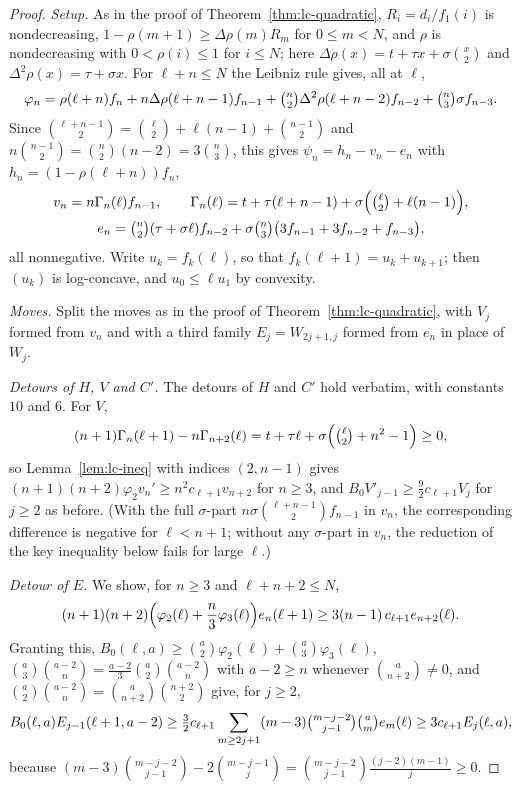 \begin{proof}
\emph{Setup.} As in the proof of Theorem~\ref{thm:lc-quadratic}, $R_i=d_i/f_1(i)$ is nondecreasing, $1-\rho(m+1)\geq\Delta\rho(m)R_m$ for $0\leq m<N$, and $\rho$ is nondecreasing with $0<\rho(i)\leq1$ for $i\leq N$; here $\Delta\rho(x)=t+\tau x+\sigma\binom x2$ and $\Delta^2\rho(x)=\tau+\sigma x$. For $\ell+n\leq N$ the Leibniz rule gives, all at $\ell$,
\[
\varphi_n=\rho(\ell+n)f_n+n\Delta\rho(\ell+n-1)f_{n-1}+\tbinom n2\Delta^2\rho(\ell+n-2)f_{n-2}+\tbinom n3\sigma f_{n-3}.
\]
Since $\binom{\ell+n-1}2=\binom\ell2+\ell(n-1)+\binom{n-1}2$ and $n\binom{n-1}2=\binom n2(n-2)=3\binom n3$, this gives $\psi_n=h_n-v_n-e_n$ with $h_n=(1-\rho(\ell+n))f_n$,
\[
\begin{gathered}
v_n=n\Gamma_n(\ell)f_{n-1},\qquad\Gamma_n(\ell)=t+\tau(\ell+n-1)+\sigma\Bigl(\tbinom\ell2+\ell(n-1)\Bigr),\\
e_n=\tbinom n2(\tau+\sigma\ell)f_{n-2}+\sigma\tbinom n3\bigl(3f_{n-1}+3f_{n-2}+f_{n-3}\bigr),
\end{gathered}
\]
all nonnegative. Write $u_k=f_k(\ell)$, so that $f_k(\ell+1)=u_k+u_{k+1}$; then $(u_k)$ is log-concave, and $u_0\leq\ell u_1$ by convexity.

\emph{Moves.} Split the moves as in the proof of Theorem~\ref{thm:lc-quadratic}, with $V_j$ formed from $v_n$ and with a third family $E_j=W_{2j+1,j}$ formed from $e_n$ in place of $W_j$.

\emph{Detours of $H$, $V$ and $C'$.} The detours of $H$ and $C'$ hold verbatim, with constants $10$ and $6$. For $V$,
\[
(n+1)\Gamma_n(\ell+1)-n\Gamma_{n+2}(\ell)=t+\tau\ell+\sigma\Bigl(\tbinom\ell2+n^2-1\Bigr)\geq0,
\]
so Lemma~\ref{lem:lc-ineq} with indices $(2,n-1)$ gives $(n+1)(n+2)\varphi_2v_n'\geq n^2c_{\ell+1}v_{n+2}$ for $n\geq3$, and $B_0V'_{j-1}\geq\frac92c_{\ell+1}V_j$ for $j\geq2$ as before. (With the full $\sigma$-part $n\sigma\binom{\ell+n-1}2f_{n-1}$ in $v_n$, the corresponding difference is negative for $\ell<n+1$; without any $\sigma$-part in $v_n$, the reduction of the key inequality below fails for large $\ell$.)

\emph{Detour of $E$.} We show, for $n\geq3$ and $\ell+n+2\leq N$,
\begin{equation}\label{eq:cubic-E}
(n+1)(n+2)\Bigl(\varphi_2(\ell)+\frac n3\varphi_3(\ell)\Bigr)e_n(\ell+1)\geq3(n-1)\,c_{\ell+1}e_{n+2}(\ell).
\end{equation}
Granting this, $B_0(\ell,a)\geq\binom a2\varphi_2(\ell)+\binom a3\varphi_3(\ell)$, $\binom a3\binom{a-2}n=\frac{a-2}3\binom a2\binom{a-2}n$ with $a-2\geq n$ whenever $\binom a{n+2}\neq0$, and $\binom a2\binom{a-2}n=\binom a{n+2}\binom{n+2}2$ give, for $j\geq2$,
\[
B_0(\ell,a)E_{j-1}(\ell+1,a-2)\geq\tfrac32c_{\ell+1}\sum_{m\geq2j+1}(m-3)\tbinom{m-j-2}{j-1}\tbinom am e_m(\ell)\geq3c_{\ell+1}E_j(\ell,a),
\]
because $(m-3)\binom{m-j-2}{j-1}-2\binom{m-j-1}j=\binom{m-j-2}{j-1}\frac{(j-2)(m-1)}j\geq0$.


\end{proof}
